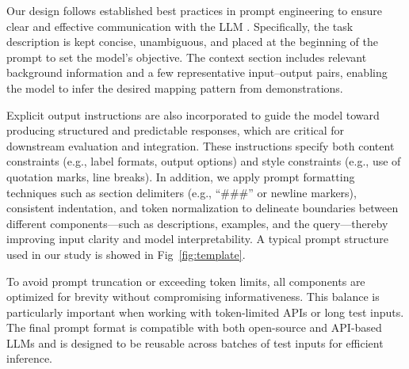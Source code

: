 \documentclass[journal,twocolumn]{IEEEtran}
\begin{document}
Our design follows established best practices in prompt engineering to ensure clear and effective communication with the LLM \cite{chen2023unleashing}. Specifically, the task description is kept concise, unambiguous, and placed at the beginning of the prompt to set the model's objective. The context section includes relevant background information and a few representative input–output pairs, enabling the model to infer the desired mapping pattern from demonstrations.

Explicit output instructions are also incorporated to guide the model toward producing structured and predictable responses, which are critical for downstream evaluation and integration. These instructions specify both content constraints (e.g., label formats, output options) and style constraints (e.g., use of quotation marks, line breaks). In addition, we apply prompt formatting techniques such as section delimiters (e.g., “\#\#\#” or newline markers), consistent indentation, and token normalization to delineate boundaries between different components—such as descriptions, examples, and the query—thereby improving input clarity and model interpretability. A typical prompt structure used in our study is showed in Fig~\ref{fig:template}.

To avoid prompt truncation or exceeding token limits, all components are optimized for brevity without compromising informativeness. This balance is particularly important when working with token-limited APIs or long test inputs. The final prompt format is compatible with both open-source and API-based LLMs and is designed to be reusable across batches of test inputs for efficient inference.
\end{document}
